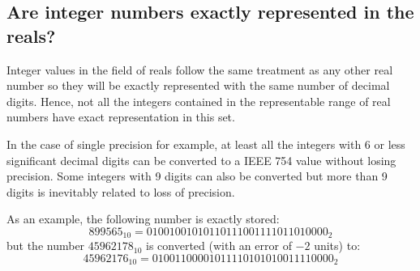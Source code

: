         \subsection{Are integer numbers exactly represented in the reals?}


Integer values in the field of reals follow the same treatment as any other real number so they will be exactly represented with the same number of decimal digits. Hence, not all the integers contained in the representable range of real numbers have exact representation in this set. 

In the case of single precision for example, at least all the integers with 6 or less significant decimal digits can be converted to a IEEE 754 value without losing precision. Some integers with 9 digits can also be converted but more than 9 digits is inevitably related to loss of precision. 

As an example, the following number is exactly stored: 
$$
899565_{10} = 01001001010110111001111011010000_2
$$
but the number $45962178_{10}$ is converted (with an error of $-2$ units) to:
$$
45962176_{10} = 01001100001011110101010011110000_2
$$







